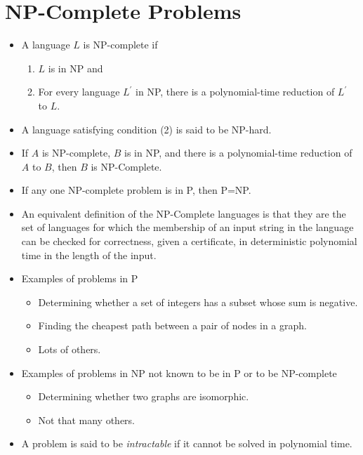 \documentclass[]{article}
\begin{document}
\section{NP-Complete Problems}
\begin{itemize}
\item A language $L$ is NP-complete if
\begin{enumerate}
\item $L$ is in NP and
\item For every language $L^\prime$ in NP, there is a polynomial-time reduction
of $L^\prime$ to $L$.
\end{enumerate}
\item A language satisfying condition (2) is said to be NP-hard.
\item If $A$ is NP-complete, $B$ is in NP, and there is a polynomial-time
reduction of $A$ to $B$, then $B$ is NP-Complete.
\item If any one NP-complete problem is in P, then P=NP.
\item An equivalent definition of the NP-Complete languages is that they are the
set of languages for which the membership of an input string in the language can
be checked for correctness, given a certificate, in deterministic polynomial
time in the length of the input.
\item Examples of problems in P
\begin{itemize}
\item Determining whether a set of integers has a subset whose sum is negative.
\item Finding the cheapest path between a pair of nodes in a graph.
\item Lots of others.
\end{itemize}
\item Examples of problems in NP not known to be in P or to be NP-complete
\begin{itemize}
\item Determining whether two graphs are isomorphic.
\item Not that many others.
\end{itemize}
\item A problem is said to be \emph{intractable} if it cannot be solved in
polynomial time.
\end{itemize}
\end{document}
